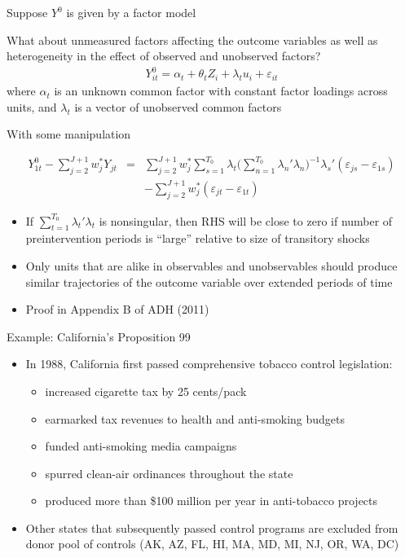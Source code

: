 \documentclass{beamer}
\begin{document}
\begin{frame}{Suppose $Y^0$ is given by a factor model}

What about unmeasured factors affecting the outcome variables as well as heterogeneity in the effect of observed and unobserved factors?
\begin{eqnarray*}
Y_{it}^0 = \alpha_t + \theta_t Z_i + \lambda_t u_i + \varepsilon_{it}
\end{eqnarray*}where $\alpha_t$ is an unknown common factor with constant factor loadings across units, and $\lambda_t$ is a vector of unobserved common factors

\end{frame}

\begin{frame}{With some manipulation}

\begin{eqnarray*}
Y^0_{1t} - \sum^{J+1}_{j=2}w^*_jY_{jt} &=& \sum_{j=2}^{J+1} w_j^* \sum_{s=1}^{T_0} \lambda_t \bigg ( \sum_{n=1}^{T_0} \lambda_n'\lambda_n \bigg )
^{-1} \lambda_s'(\varepsilon_{js} - \varepsilon_{1s} ) \\
&& - \sum_{j=2}^{J+1} w_j^* (\varepsilon_{jt} - \varepsilon_{1t})
\end{eqnarray*}

\begin{itemize}
\item If $\sum_{t=1}^{T_0} \lambda_t' \lambda_t$ is nonsingular, then RHS will be close to zero if number of preintervention periods is ``large''  relative to size of transitory shocks 
\item Only units that are alike in observables and unobservables should produce similar trajectories of the outcome variable over extended periods of time
\item Proof in Appendix B of ADH (2011)
\end{itemize}


\end{frame}


\begin{frame}{Example: California's Proposition 99}
	
	\begin{itemize}
	\item In 1988, California first passed comprehensive tobacco control legislation:
		\begin{itemize}
		\item increased cigarette tax by 25 cents/pack
		\item earmarked tax revenues to health and anti-smoking budgets
		\item funded anti-smoking media campaigns
		\item spurred clean-air ordinances throughout the state
		\item produced more than \$100 million per year in anti-tobacco projects
		\end{itemize}
	\item Other states that subsequently passed control programs are excluded from donor pool of controls (AK, AZ, FL, HI, MA, MD, MI, NJ, OR, WA, DC)
	\end{itemize}
\end{frame}
\end{document}
